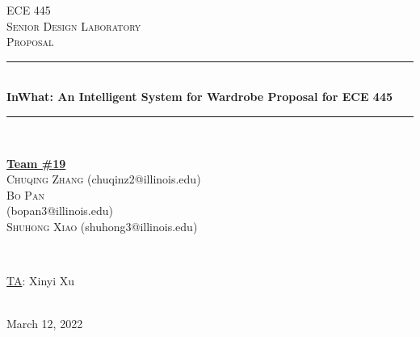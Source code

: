 \documentclass[12pt]{article}
\begin{document}
\begin{titlepage}
\newcommand{\HRule}{\rule{\linewidth}{0.1mm}} 
\center %
 
\textsc{\Large ECE 445}\\[0.5cm] %
\textsc{\large Senior Design Laboratory}\\[0.5cm] %
\textsc{\Large Proposal }\\[0.5cm] %

\HRule \\[0.5cm]
\huge \textbf{	InWhat: An Intelligent System for Wardrobe Proposal for ECE 445} %
\HRule \\[2cm]
 
\begin{minipage}{0.5\textwidth}
    \begin{center} \large
        \underline{\textbf{Team \#19}} \\ \medskip
        \textsc{Chuqing Zhang} (chuqinz2@illinois.edu) \\
        \textsc{Bo Pan}\\ (bopan3@illinois.edu) \\  %
        \textsc{Shuhong Xiao} (shuhong3@illinois.edu) \\

    \end{center}
\end{minipage} \\[1.5cm]

\begin{minipage}{0.5\textwidth}
    \begin{center}
        \large
        \underline{TA}: Xinyi Xu
    \end{center}
\end{minipage} \\[1cm]

{\large March 12, 2022} %

\vfill %

\end{titlepage}
\tableofcontents
\newpage
\end{document}

